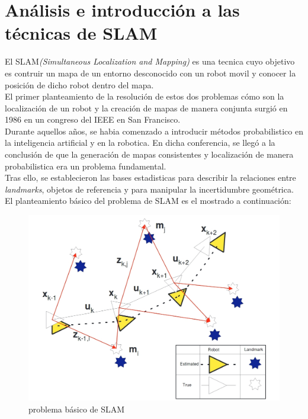 \section{Análisis e introducción a las técnicas de SLAM}
El SLAM\textit{(Simultaneous Localization and Mapping)} es una tecnica cuyo objetivo es contruir un mapa de un entorno desconocido con un robot movil 
y conocer la posición de dicho robot dentro del mapa. \\
El primer planteamiento de la resolución de estos dos problemas cómo son la localización de un robot y la creación de mapas de manera conjunta surgió 
en 1986 en un congreso del IEEE en San Francisco. \\
Durante aquellos años, se habia comenzado a introducir métodos probabilistico en la inteligencia artificial 
y en la robotica. En dicha conferencia, se llegó a la conclusión de que la generación de mapas consistentes y localización de manera probabilistica era
un problema fundamental.\\

Tras ello, se establecieron las bases estadisticas para describir la relaciones entre \textit{landmarks}, objetos de referencia y 
para manipular la incertidumbre geométrica. \\
El planteamiento básico del problema de SLAM es el mostrado a continuación:
\begin{figure}[h!]
    \centering
    \includegraphics[width=.6\textwidth]{images/slam_prob}
    \caption{problema básico de SLAM}
\end{figure}

